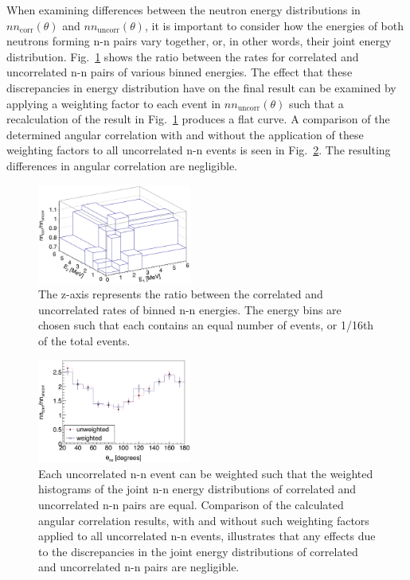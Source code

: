 \documentclass[%
 reprint,
 amsmath,amssymb,
 aps,
 nofootinbib
]{revtex4-1}
\begin{document}
When examining differences between the neutron energy distributions in $nn_{\text{corr}}(\theta)$ and $nn_{\text{uncorr}}(\theta)$, it is important to consider how the energies of both neutrons forming n-n pairs vary together, or, in other words, their joint energy distribution.
Fig.~\ref{fig:ErgDiffLego} shows the ratio between the rates for correlated and uncorrelated n-n pairs of various binned energies.
The effect that these discrepancies in energy distribution have on the final result can be examined by applying a weighting factor to each event in $nn_{\text{uncorr}}(\theta)$ such that a recalculation of the result in Fig.~\ref{fig:ErgDiffLego} produces a flat curve.
A comparison of the determined angular correlation with and without the application of these weighting factors to all uncorrelated n-n events is seen in Fig.~\ref{fig:WeightedErgDiff}.
The resulting differences in angular correlation are negligible.
\begin{figure}[]
\centering
    \includegraphics[width=0.45\textwidth]{ErgDiffLego.png}
    \caption{
    The z-axis represents the ratio between the correlated and uncorrelated rates of binned n-n energies.
    The energy bins are chosen such that each contains an equal number of events, or 1/16th of the total events.
    }
    \label{fig:ErgDiffLego}
\end{figure}
\begin{figure}[]
\centering
    \includegraphics[width=0.45\textwidth]{WeightedErgDiff.png}
    \caption{
Each uncorrelated n-n event can be weighted such that the weighted histograms of the joint n-n energy distributions of correlated and uncorrelated n-n pairs are equal.
Comparison of the calculated angular correlation results, with and without such weighting factors applied to all uncorrelated n-n events, illustrates that any effects due to the discrepancies in the joint energy distributions of correlated and uncorrelated n-n pairs are negligible.
    }
    \label{fig:WeightedErgDiff}
\end{figure}
\end{document}
